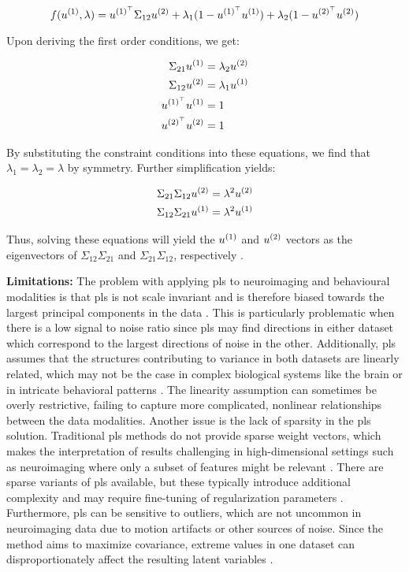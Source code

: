 \begin{equation}
    f(u^{(1)}, \lambda) = u^{(1)^{\top}} \Sigma_{12} u^{(2)} + \lambda_1 (1 - u^{(1)^{\top}}u^{(1)}) + \lambda_2 (1 - u^{(2)^{\top}}u^{(2)})
\end{equation}

Upon deriving the first order conditions, we get:

\begin{align}
    \Sigma_{21} u^{(1)} & = \lambda_2 u^{(2)} \\
    \Sigma_{12} u^{(2)} & = \lambda_1 u^{(1)} \\
    u^{(1)^{\top}}u^{(1)}  & = 1                  \\
    u^{(2)^{\top}}u^{(2)}  & = 1
\end{align}

By substituting the constraint conditions into these equations, we find that \( \lambda_1 = \lambda_2 = \lambda \) by symmetry. Further simplification yields:

\begin{align}
    \Sigma_{21} \Sigma_{12} u^{(2)} & = \lambda^2 u^{(2)} \\
    \Sigma_{12} \Sigma_{21} u^{(1)} & = \lambda^2 u^{(1)}
\end{align}

Thus, solving these equations will yield the \( u^{(1)} \) and \( u^{(2)} \) vectors as the eigenvectors of \( \Sigma_{12} \Sigma_{21} \) and \( \Sigma_{21} \Sigma_{12} \), respectively \citep{hoskuldsson1988pls}.

\textbf{Limitations: } The problem with applying \acrshort{pls} to neuroimaging and behavioural modalities is that \acrshort{pls} is not scale invariant and
is therefore biased towards the largest principal components in the data \citep{helmer2020stability}.
This is particularly problematic when there is a low signal to noise ratio since \acrshort{pls} may find directions in either dataset which correspond to the largest directions of noise in the other.
Additionally, \acrshort{pls} assumes that the structures contributing to variance in both datasets are linearly related, which
may not be the case in complex biological systems like the brain or in intricate behavioral patterns \citep{rosipal2005overview}.
The linearity assumption can sometimes be overly restrictive, failing to capture more complicated, nonlinear relationships between the data modalities.
Another issue is the lack of sparsity in the \acrshort{pls} solution.
Traditional \acrshort{pls} methods do not provide sparse weight vectors, which makes the interpretation of results challenging in high-dimensional settings such as neuroimaging where only a subset of features might be relevant \citep{leurgans1993canonical}.
There are sparse variants of \acrshort{pls} available, but these typically introduce additional complexity and may require fine-tuning of regularization parameters \citep{chun2010sparse}.
Furthermore, \acrshort{pls} can be sensitive to outliers, which are not uncommon in neuroimaging data due to motion artifacts or other sources of noise.
Since the method aims to maximize covariance, extreme values in one dataset can disproportionately affect the resulting latent variables \citep{wold1975path}.

